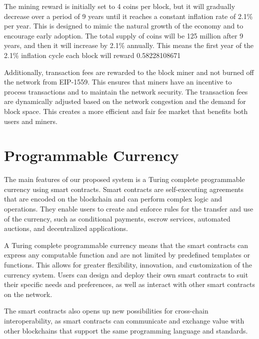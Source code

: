 \documentclass[a4paper,onecolumn, superscriptaddress,10pt,accepted=2020-05-01,issue=1, volume=2, shorttitle=papers]{compositionalityarticle}
\begin{document}
\vspace{0.3cm}

The mining reward is initially set to 4 coins per block, but it will gradually decrease over a period of 9 years until it reaches a constant inflation rate of 2.1\% per year. This is designed to mimic the natural growth of the economy and to encourage early adoption. The total supply of coins will be 125 million after 9 years, and then it will increase by 2.1\% annually. This means the first year of the 2.1\% inflation cycle each block will reward 0.58228108671

\vspace{0.3cm}

Additionally, transaction fees are rewarded to the block miner and not burned off the network from EIP-1559. This ensures that miners have an incentive to process transactions and to maintain the network security. The transaction fees are dynamically adjusted based on the network congestion and the demand for block space. This creates a more efficient and fair fee market that benefits both users and miners.

\vspace{1cm}

\section{Programmable Currency}

The main features of our proposed system is a Turing complete programmable currency using smart contracts. Smart contracts are self-executing agreements that are encoded on the blockchain and can perform complex logic and operations. They enable users to create and enforce rules for the transfer and use of the currency, such as conditional payments, escrow services, automated auctions, and decentralized applications. 

\vspace{0.3cm}

A Turing complete programmable currency means that the smart contracts can express any computable function and are not limited by predefined templates or functions. This allows for greater flexibility, innovation, and customization of the currency system. Users can design and deploy their own smart contracts to suit their specific needs and preferences, as well as interact with other smart contracts on the network. 

\vspace{0.3cm}

The smart contracts also opens up new possibilities for cross-chain interoperability, as smart contracts can communicate and exchange value with other blockchains that support the same programming language and standards.
\end{document}
